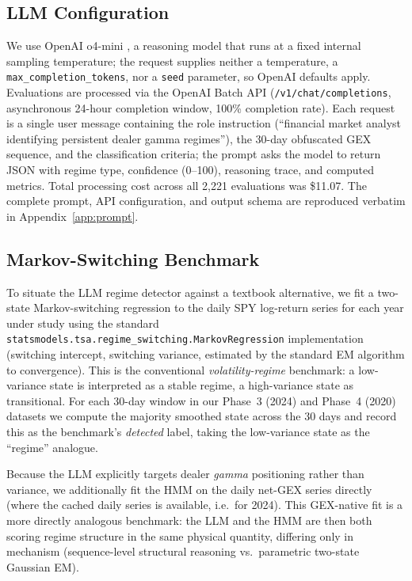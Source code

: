 \subsection{LLM Configuration}

We use OpenAI o4-mini \citep{openai2024reasoning}, a reasoning model that runs at a fixed internal sampling temperature; the request supplies neither a temperature, a \texttt{max\_completion\_tokens}, nor a \texttt{seed} parameter, so OpenAI defaults apply. Evaluations are processed via the OpenAI Batch API (\texttt{/v1/chat/completions}, asynchronous 24-hour completion window, 100\% completion rate). Each request is a single user message containing the role instruction (``financial market analyst identifying persistent dealer gamma regimes''), the 30-day obfuscated GEX sequence, and the classification criteria; the prompt asks the model to return JSON with regime type, confidence (0--100), reasoning trace, and computed metrics. Total processing cost across all 2,221 evaluations was \$11.07. The complete prompt, API configuration, and output schema are reproduced verbatim in Appendix~\ref{app:prompt}.

\subsection{Markov-Switching Benchmark}
\label{sec:methodology:benchmark}

To situate the LLM regime detector against a textbook alternative, we fit
a two-state Markov-switching regression
\citep{hamilton1989new,nystrup2020regime} to the daily SPY log-return
series for each year under study using the standard
\texttt{statsmodels.tsa.regime\_switching.MarkovRegression}
implementation (switching intercept, switching variance, estimated by
the standard EM algorithm to convergence). This is the conventional
\textit{volatility-regime} benchmark: a low-variance state is interpreted
as a stable regime, a high-variance state as transitional. For each
30-day window in our Phase~3 (2024) and Phase~4 (2020) datasets we
compute the majority smoothed state across the 30 days and record this
as the benchmark's \emph{detected} label, taking the low-variance state
as the ``regime'' analogue.

Because the LLM explicitly targets dealer \emph{gamma} positioning rather
than variance, we additionally fit the HMM on the daily net-GEX series
directly (where the cached daily series is available, i.e.\ for 2024).
This GEX-native fit is a more directly analogous benchmark: the LLM and
the HMM are then both scoring regime structure in the same physical
quantity, differing only in mechanism (sequence-level structural
reasoning vs.\ parametric two-state Gaussian EM).

